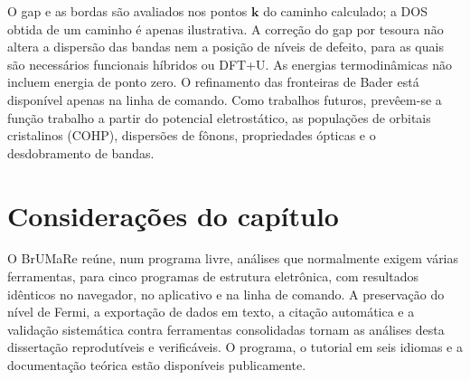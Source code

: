 O gap e as bordas são avaliados nos pontos $\mathbf k$ do caminho calculado; a DOS obtida de um caminho é apenas ilustrativa. A correção do gap por tesoura não altera a dispersão das bandas nem a posição de níveis de defeito, para as quais são necessários funcionais híbridos ou DFT+U. As energias termodinâmicas não incluem energia de ponto zero. O refinamento das fronteiras de Bader está disponível apenas na linha de comando. Como trabalhos futuros, prevêem-se a função trabalho a partir do potencial eletrostático, as populações de orbitais cristalinos (COHP), dispersões de fônons, propriedades ópticas e o desdobramento de bandas.

\section{Considerações do capítulo}

O BrUMaRe reúne, num programa livre, análises que normalmente exigem várias ferramentas, para cinco programas de estrutura eletrônica, com resultados idênticos no navegador, no aplicativo e na linha de comando. A preservação do nível de Fermi, a exportação de dados em texto, a citação automática e a validação sistemática contra ferramentas consolidadas tornam as análises desta dissertação reprodutíveis e verificáveis. O programa, o tutorial em seis idiomas e a documentação teórica estão disponíveis publicamente.
